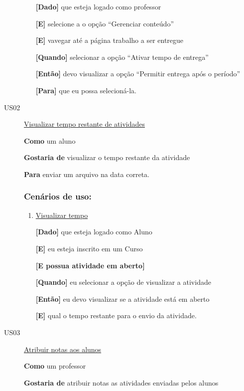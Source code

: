 \begin{description}
\begin{enumerate}
\textbf{[Dado]} que esteja logado como professor

\textbf{[E]} selecione a o opção ``Gerenciar conteúdo''

\textbf{[E]} vavegar até a página trabalho a ser entregue

\textbf{[Quando]} selecionar a opção ``Ativar tempo de entrega''

\textbf{[Então]} devo visualizar a opção ``Permitir entrega após o período''

\textbf{[Para]} que eu possa selecioná-la.

\end{enumerate}

\item [US02\label{us02}]\underline{Visualizar tempo restante de atividades}

\textbf{Como} um aluno

\textbf{Gostaria de} visualizar o tempo restante da atividade

\textbf{Para} enviar um arquivo na data correta.

\subsubsection*{Cenários de uso:}

\begin{enumerate}
\item \underline{Visualizar tempo}

\textbf{[Dado]} que esteja logado como Aluno

\textbf{[E]} eu esteja inscrito em um Curso

\textbf{[E possua atividade em aberto]}

\textbf{[Quando]} eu selecionar a opção de visualizar a atividade

\textbf{[Então]} eu devo visualizar se a atividade está em aberto

\textbf{[E]} qual o tempo restante para o envio da atividade.

\end{enumerate}


\item [US03\label{us03}] \underline{Atribuir notas aos alunos}

\textbf{Como} um professor

\textbf{Gostaria de} atribuir notas as atividades enviadas pelos alunos


\end{description}
